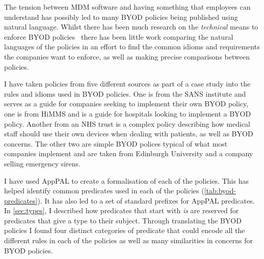 \documentclass[a4paper]{scrartcl}
\begin{document}
The tension between \ac{MDM} software and having something that employees can
understand has possibly led to many BYOD policies being published using natural
language. Whilst there has been much research on the \emph{technical} means to
enforce BYOD
policies~\cite{martinelli_enhancing_2016,armando_enabling_2014,costantino_towards_2013}
there has been little work comparing the natural languages of the policies in an
effort to find the common idioms and requirements the companies want to enforce,
as well as making precise comparisons between policies.

I have taken policies from five different sources as part of a case study into
the rules and idioms used in BYOD policies.  One is from the SANS
institute and serves as a guide for companies seeking to implement their own
BYOD policy, one is from HiMMS and is a guide for hospitals looking to implement
a BYOD policy.  Another from an NHS trust is a complex policy describing
how medical staff should use their own devices when dealing with patients, as
well as BYOD concerns.  The other two are simple BYOD polices typical of what
most companies implement and are taken from Edinburgh University and a company
selling emergency sirens.

I have used AppPAL to create a formalisation of each of the policies. This has
helped identify common predicates used in each of the policies
(\autoref{tab:byod-predicates}). It has also led to a set of
standard prefixes for AppPAL predicates. In \autoref{sec:types}, I described how
predicates that start with \emph{is} are reserved for predicates that give a
type to their subject. Through translating the BYOD policies I found four
distinct categories of predicate that could encode all the different rules in
each of the policies as well as many similarities in concerns for BYOD
policies.
\end{document}
